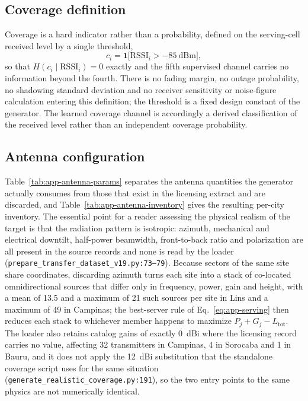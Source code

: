 \subsection{Coverage definition}

Coverage is a hard indicator rather than a probability, defined on the
serving-cell received level by a single threshold,
\begin{equation}
c_{i} = \mathbf{1}\bigl[\mathrm{RSSI}_{i} > -85\ \mathrm{dBm}\bigr] ,
\label{eq:app-coverage}
\end{equation}
so that $H(c_{i}\mid \mathrm{RSSI}_{i}) = 0$ exactly and the fifth
supervised channel carries no information beyond the fourth. There is no
fading margin, no outage probability, no shadowing standard deviation and
no receiver sensitivity or noise-figure calculation entering this
definition; the threshold is a fixed design constant of the generator. The
learned coverage channel is accordingly a derived classification of the
received level rather than an independent coverage probability.

\subsection{Antenna configuration}

Table~\ref{tab:app-antenna-params} separates the antenna quantities the
generator actually consumes from those that exist in the licensing extract
and are discarded, and Table~\ref{tab:app-antenna-inventory} gives the
resulting per-city inventory. The essential point for a reader assessing
the physical realism of the target is that the radiation pattern is
isotropic: azimuth, mechanical and electrical downtilt, half-power
beamwidth, front-to-back ratio and polarization are all present in the
source records and none is read by the loader
(\texttt{prepare\_\allowbreak{}transfer\_\allowbreak{}dataset\_\allowbreak{}v19.py:\allowbreak{}73--79}). Because sectors of the
same site share coordinates, discarding azimuth turns each site into a
stack of co-located omnidirectional sources that differ only in frequency,
power, gain and height, with a mean of 13.5 and a maximum of 21 such
sources per site in Lins and a maximum of 49 in Campinas; the best-server
rule of Eq.~\eqref{eq:app-serving} then reduces each stack to whichever
member happens to maximize $P_{j}+G_{j}-L_{\mathrm{tot}}$. The loader also
retains catalog gains of exactly 0~dBi where the licensing record carries
no value, affecting 32 transmitters in Campinas, 4 in Sorocaba and 1 in
Bauru, and it does not apply the 12~dBi substitution that the standalone
coverage script uses for the same situation
(\texttt{generate\_\allowbreak{}realistic\_\allowbreak{}coverage\allowbreak{}.py:\allowbreak{}191}), so the two entry points to
the same physics are not numerically identical.

